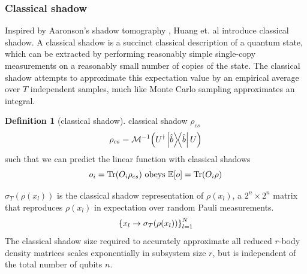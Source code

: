 \documentclass[
10pt,
aps,
pra,
linenumbers,
floatfix,
]{revtex4-2}
\theoremstyle{plain}
\theoremstyle{definition}
\newtheorem{definition}{Definition}
\newtheorem{remark}{Remark}
\newcommand{\dm}{\rho}
\begin{document}
\subsubsection{Classical shadow}\label{sec:classical_shadow}
Inspired by Aaronson's shadow tomography \cite{aaronsonShadowTomographyQuantum2018}, Huang et. al \cite{huangPredictingManyProperties2020} introduce classical shadow.
A classical shadow is a succinct classical description of a quantum state, which can be extracted by performing reasonably simple single-copy measurements on a reasonably small number of copies of the state.
The classical shadow attempts to approximate this expectation value by an empirical average over $T$ independent samples, much like Monte Carlo sampling approximates an integral.
\begin{definition}[classical shadow]\label{def:classical_shadow}
	classical shadow $\dm_{cs}$
	\begin{equation}
		\dm_{cs} = \mathcal{M}^{-1} \qty(U^\dagger \op{\hat{b}} U)
	\end{equation}
	such that we can predict the linear function with classical shadows
	\begin{equation}
		o_i = \Tr(O_i \dm_{cs})
		\text{ obeys }
		\expectation[o] =\Tr(O_i \dm)
	\end{equation}
\end{definition}
$\sigma_T(\dm(x_l))$ is the classical shadow representation of $\dm(x_l)$, 
a $2^n\times 2^n$ matrix that reproduces $\dm(x_l)$ in expectation over random Pauli measurements.
\begin{equation}
	\qty{x_l\to\sigma_T(\dm(x_l))}_{l=1}^N
\end{equation}
The classical shadow size required to accurately approximate all reduced $r$-body density matrices scales exponentially in subsystem size $r$, but is independent of the total number of qubits $n$.
\end{document}
